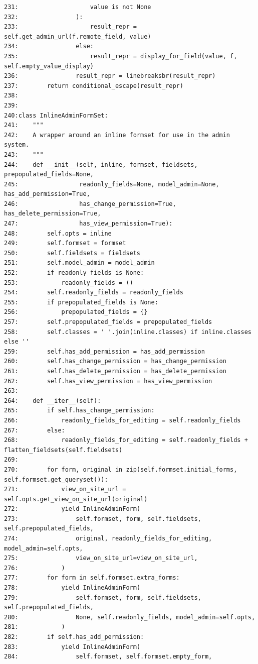 {\begin{observationbox}
\begin{Verbatim}[breaklines=true, breakanywhere=true]
231:                    value is not None
232:                ):
233:                    result_repr = self.get_admin_url(f.remote_field, value)
234:                else:
235:                    result_repr = display_for_field(value, f, self.empty_value_display)
236:                result_repr = linebreaksbr(result_repr)
237:        return conditional_escape(result_repr)
238:
239:
240:class InlineAdminFormSet:
241:    """
242:    A wrapper around an inline formset for use in the admin system.
243:    """
244:    def __init__(self, inline, formset, fieldsets, prepopulated_fields=None,
245:                 readonly_fields=None, model_admin=None, has_add_permission=True,
246:                 has_change_permission=True, has_delete_permission=True,
247:                 has_view_permission=True):
248:        self.opts = inline
249:        self.formset = formset
250:        self.fieldsets = fieldsets
251:        self.model_admin = model_admin
252:        if readonly_fields is None:
253:            readonly_fields = ()
254:        self.readonly_fields = readonly_fields
255:        if prepopulated_fields is None:
256:            prepopulated_fields = {}
257:        self.prepopulated_fields = prepopulated_fields
258:        self.classes = ' '.join(inline.classes) if inline.classes else ''
259:        self.has_add_permission = has_add_permission
260:        self.has_change_permission = has_change_permission
261:        self.has_delete_permission = has_delete_permission
262:        self.has_view_permission = has_view_permission
263:
264:    def __iter__(self):
265:        if self.has_change_permission:
266:            readonly_fields_for_editing = self.readonly_fields
267:        else:
268:            readonly_fields_for_editing = self.readonly_fields + flatten_fieldsets(self.fieldsets)
269:
270:        for form, original in zip(self.formset.initial_forms, self.formset.get_queryset()):
271:            view_on_site_url = self.opts.get_view_on_site_url(original)
272:            yield InlineAdminForm(
273:                self.formset, form, self.fieldsets, self.prepopulated_fields,
274:                original, readonly_fields_for_editing, model_admin=self.opts,
275:                view_on_site_url=view_on_site_url,
276:            )
277:        for form in self.formset.extra_forms:
278:            yield InlineAdminForm(
279:                self.formset, form, self.fieldsets, self.prepopulated_fields,
280:                None, self.readonly_fields, model_admin=self.opts,
281:            )
282:        if self.has_add_permission:
283:            yield InlineAdminForm(
284:                self.formset, self.formset.empty_form,

\end{Verbatim}
\end{observationbox}}
